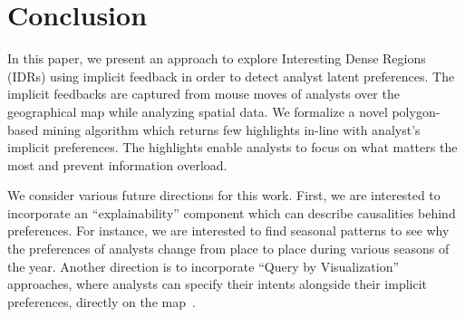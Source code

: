 \documentclass[sigconf,edbt]{acmart-edbt2019}
\begin{document}
\section{Conclusion}
\label{sec:conclusion}

In this paper, we present an approach to explore Interesting Dense Regions (IDRs) using implicit feedback in order to detect analyst latent preferences. The implicit feedbacks are captured from mouse moves of analysts over the geographical map while analyzing spatial data. We formalize a novel polygon-based mining algorithm which returns few highlights in-line with analyst's implicit preferences. The highlights enable analysts to focus on what matters the most and prevent information overload.

\vspace{2pt}
We consider various future directions for this work. First, we are interested to incorporate an ``explainability'' component which can describe causalities behind preferences. For instance, we are interested to find seasonal patterns to see why the preferences of analysts change from place to place during various seasons of the year. Another direction is to incorporate ``Query by Visualization'' approaches, where analysts can specify their intents alongside their implicit preferences, directly on the map~\cite{siddiqui2016effortless}.



 
\end{document}
